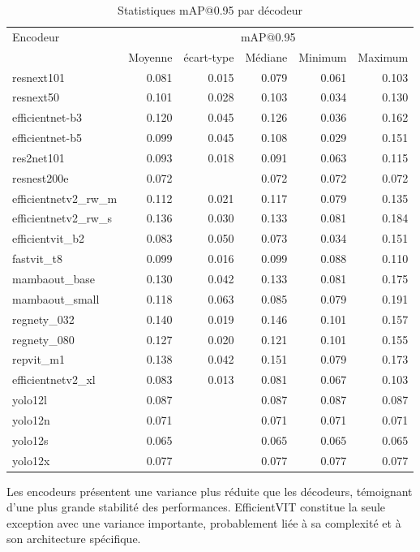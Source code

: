 \begin{table}[H]
    \centering
    \begin{tabular}{lrrrrr}
    \toprule
    Encodeur & \multicolumn{5}{c}{mAP@0.95} \\
    & Moyenne & écart-type & Médiane & Minimum & Maximum \\
    \midrule
    resnext101 & 0.081 & 0.015 & 0.079 & 0.061 & 0.103 \\
    resnext50 & 0.101 & 0.028 & 0.103 & 0.034 & 0.130 \\
    efficientnet-b3 & 0.120 & 0.045 & 0.126 & 0.036 & 0.162 \\
    efficientnet-b5 & 0.099 & 0.045 & 0.108 & 0.029 & 0.151 \\
    res2net101 & 0.093 & 0.018 & 0.091 & 0.063 & 0.115 \\
    resnest200e & 0.072 &  & 0.072 & 0.072 & 0.072 \\
    efficientnetv2\_rw\_m & 0.112 & 0.021 & 0.117 & 0.079 & 0.135 \\
    efficientnetv2\_rw\_s & 0.136 & 0.030 & 0.133 & 0.081 & 0.184 \\
    efficientvit\_b2 & 0.083 & 0.050 & 0.073 & 0.034 & 0.151 \\
    fastvit\_t8 & 0.099 & 0.016 & 0.099 & 0.088 & 0.110 \\
    mambaout\_base & 0.130 & 0.042 & 0.133 & 0.081 & 0.175 \\
    mambaout\_small & 0.118 & 0.063 & 0.085 & 0.079 & 0.191 \\
    regnety\_032 & 0.140 & 0.019 & 0.146 & 0.101 & 0.157 \\
    regnety\_080 & 0.127 & 0.020 & 0.121 & 0.101 & 0.155 \\
    repvit\_m1 & 0.138 & 0.042 & 0.151 & 0.079 & 0.173 \\
    efficientnetv2\_xl & 0.083 & 0.013 & 0.081 & 0.067 & 0.103 \\
    yolo12l & 0.087 &  & 0.087 & 0.087 & 0.087 \\
    yolo12n & 0.071 &  & 0.071 & 0.071 & 0.071 \\
    yolo12s & 0.065 &  & 0.065 & 0.065 & 0.065 \\
    yolo12x & 0.077 &  & 0.077 & 0.077 & 0.077 \\
    \bottomrule
    \end{tabular}
    \caption{Statistiques mAP@0.95 par décodeur}
    \label{tab:statistique_par_encodeur_map95}
\end{table}

Les encodeurs présentent une variance plus réduite que les décodeurs, témoignant d'une plus grande stabilité des performances. EfficientVIT constitue la seule exception avec une variance importante, probablement liée à sa complexité et à son architecture spécifique.

